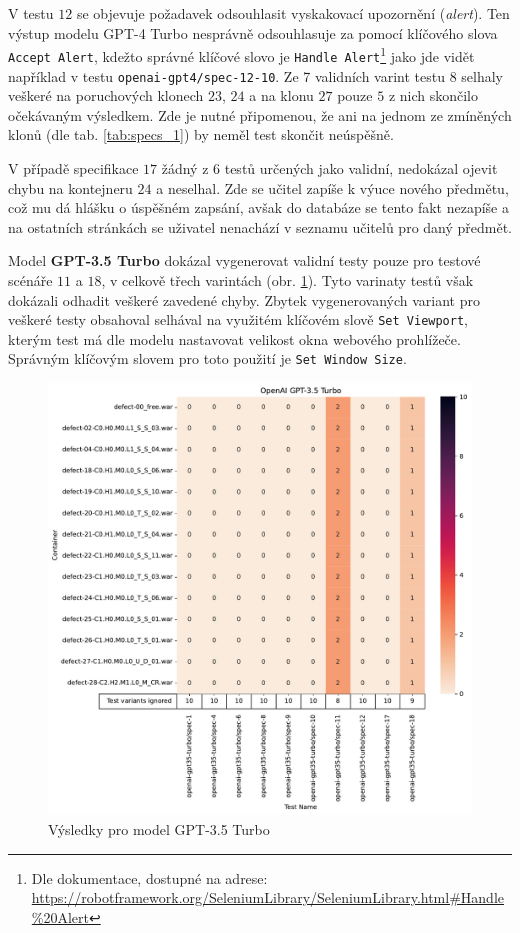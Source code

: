 \documentclass[czech, ma, kiv, he, iso690alph, pdf, viewonly]{fasthesis}
\begin{document}
            V testu \(12\) se objevuje požadavek odsouhlasit vyskakovací upozornění (\textit{alert}). Ten výstup modelu GPT-4 Turbo nesprávně odsouhlasuje za pomocí klíčového slova \verb|Accept Alert|, kdežto správné klíčové slovo je \verb|Handle Alert|\footnote{Dle dokumentace, dostupné na adrese: \url{https://robotframework.org/SeleniumLibrary/SeleniumLibrary.html#Handle\%20Alert}} jako jde vidět například v testu \verb|openai-gpt4/spec-12-10|. Ze 7 validních varint testu \(8\) selhaly veškeré na poruchových klonech \(23\), \(24\) a na klonu \(27\) pouze \(5\) z nich skončilo očekávaným výsledkem. Zde je nutné připomenou, že ani na jednom ze zmíněných klonů (dle tab. \ref{tab:specs_1}) by neměl test skončit neúspěšně.

            V případě specifikace \(17\) žádný z 6 testů určených jako validní, nedokázal ojevit chybu na kontejneru \(24\) a neselhal. Zde se učitel zapíše k výuce nového předmětu, což mu dá hlášku o úspěšném zapsání, avšak do databáze se tento fakt nezapíše a na ostatních stránkách se uživatel nenachází v seznamu učitelů pro daný předmět.

            Model \textbf{GPT-3.5 Turbo} dokázal vygenerovat validní testy pouze pro testové scénáře \(11\) a \(18\), v celkově třech varintách (obr. \ref{fig:res:gpt-35-turbo}). Tyto varinaty testů však dokázali odhadit veškeré zavedené chyby. Zbytek vygenerovaných variant pro veškeré testy obsahoval selhával na využitém klíčovém slově \verb|Set Viewport|, kterým test má dle modelu nastavovat velikost okna webového prohlížeče. Správným klíčovým slovem pro toto použití je \verb|Set Window Size|.

            \begin{figure}
                \includegraphics[width=\textwidth]{pic/gpt-3.5-turbo-results.pdf}
                \caption{Výsledky pro model GPT-3.5 Turbo}
                \label{fig:res:gpt-35-turbo}
            \end{figure}
\end{document}
